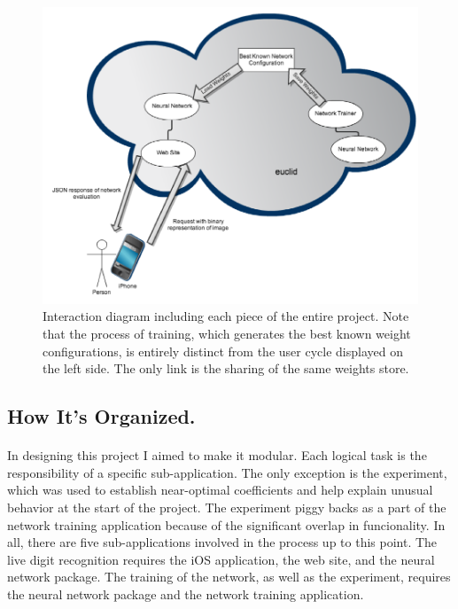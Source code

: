 \documentclass{article}
\begin{document}
    \begin{figure}
        \centering
        \includegraphics[scale=0.4]{images/diagram.png}
        \caption{Interaction diagram including each piece of the entire project.
            Note that the process of training, which generates the best known
            weight configurations, is entirely distinct from the user cycle 
            displayed on the left side. The only link is the sharing of the
            same weights store.}
        \label{diagram}
    \end{figure}

\subsection{How It's Organized.}

    \paragraph{}In designing this project I aimed to make it modular. Each logical
    task is the responsibility of a specific sub-application. The only exception
    is the experiment, which was used to establish near-optimal coefficients and 
    help explain unusual behavior at the start of the project.
    The experiment piggy backs as a part of the network training application 
    because of the significant overlap in funcionality. In all, there are five
    sub-applications involved in the process up to this point. The 
    live digit recognition requires the iOS application, the web site, and the
    neural network package. The training of the network, as well as the experiment,
    requires the neural network package and the network training application.
\end{document}
